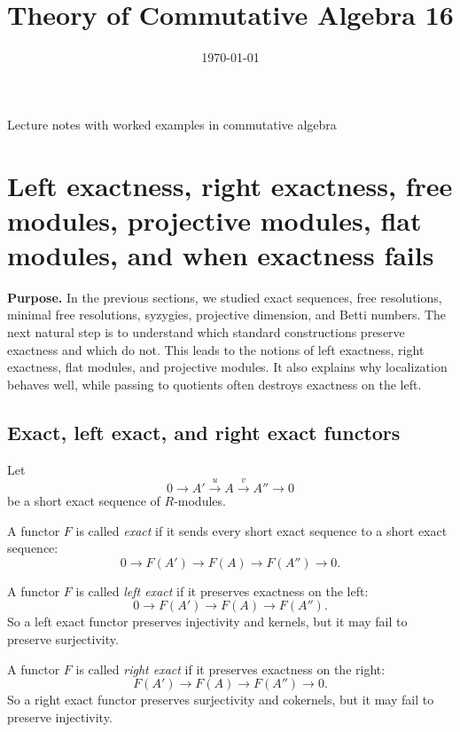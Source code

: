 \documentclass[12pt,a4paper]{article}
\title{\vspace{-1.5em}\bfseries Theory of Commutative Algebra 16}
\author{}
\date{\today}
\theoremstyle{notespace}
\theoremstyle{definition}
\begin{document}
	\maketitle
	\thispagestyle{plain}
		\begin{center}
		\begin{minipage}{0.92\textwidth}
			Lecture notes with worked examples in commutative algebra
		\end{minipage}
	\end{center}
		\tableofcontents
	\clearpage

\section{Left exactness, right exactness, free modules, projective modules, flat modules, and when exactness fails}

\textbf{Purpose.}
In the previous sections, we studied exact sequences, free resolutions, minimal free resolutions, syzygies, projective dimension, and Betti numbers.
The next natural step is to understand which standard constructions preserve exactness and which do not.
This leads to the notions of left exactness, right exactness, flat modules, and projective modules.
It also explains why localization behaves well, while passing to quotients often destroys exactness on the left.

\subsection{ Exact, left exact, and right exact functors}

Let
\[
0 \longrightarrow A' \xrightarrow{u} A \xrightarrow{v} A'' \longrightarrow 0
\]
be a short exact sequence of \(R\)-modules.

A functor \(F\) is called \emph{exact} if it sends every short exact sequence to a short exact sequence:
\[
0 \longrightarrow F(A') \longrightarrow F(A) \longrightarrow F(A'') \longrightarrow 0.
\]

A functor \(F\) is called \emph{left exact} if it preserves exactness on the left:
\[
0 \longrightarrow F(A') \longrightarrow F(A) \longrightarrow F(A'').
\]
So a left exact functor preserves injectivity and kernels, but it may fail to preserve surjectivity.

A functor \(F\) is called \emph{right exact} if it preserves exactness on the right:
\[
F(A') \longrightarrow F(A) \longrightarrow F(A'') \longrightarrow 0.
\]
So a right exact functor preserves surjectivity and cokernels, but it may fail to preserve injectivity.
\end{document}
